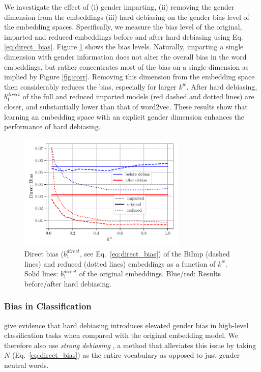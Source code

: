 \documentclass[11pt,a4paper]{article}
\def\proposedmethod{BiImp}
\begin{document}
We investigate the effect of (i) gender imparting, (ii) 
removing the gender dimension from the embeddings (iii) hard debiasing
\citep{bolukbasi16debiasing} on the gender bias level of the embedding spaces. Specifically, we measure the bias level of the original, imparted and reduced embeddings before and after hard debiasing using Eq. \ref{eq:direct_bias}.
Figure \ref{fig:bias}
shows the bias levels.
Naturally, imparting  a single
dimension with
gender information 
does not alter the overall bias in the word
 embeddings, but rather concentrates most of the bias on a
 single dimension as implied by Figure
 \ref{fig:corr}. Removing this dimension from the embedding
 space then considerably reduces the bias, especially for
 larger $k^w$. After hard debiasing,
$b^{direct}_1$
of the full and reduced imparted models (red dashed
 and dotted lines) are closer, and
 substantially lower than that of word2vec. These results show that learning
   an embedding space with an explicit gender dimension
   enhances the performance of hard debiasing.

\begin{figure}
	\centering
	\includegraphics[width=8.0cm]{Figures/gender_bias_reduction.pdf}
	\caption{Direct bias
          ($b^{direct}_1$, see Eq.\  \ref{eq:direct_bias})
of the \proposedmethod{}
          (dashed lines) and reduced 
          (dotted lines) embeddings as a function of $k^w$. Solid lines:
          $b^{direct}_1$
 of the original embeddings. Blue/red: Results before/after
 hard debiasing.}
	\label{fig:bias}
\end{figure}

\subsubsection{Bias in Classification}

\citet{prost19biasTextClassif} give evidence that hard debiasing  introduces elevated
gender bias in high-level classification tasks when compared
with the original embedding model.
We therefore also use 
\textit{strong debiasing} \citep{prost19biasTextClassif},
a method that alleviates this issue
by taking $N$ (Eq.\  \ref{eq:direct_bias}) as the entire
vocabulary as opposed to just gender neutral words.
\end{document}
